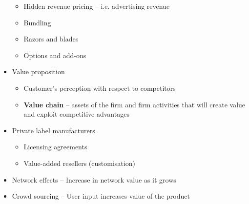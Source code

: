 \documentclass[../notes_compiled.tex]{subfiles}
\begin{document}
\begin{multicols}{2}
\begin{itemize}
\begin{itemize}
\item Hidden revenue pricing -- i.e. advertising revenue
\item Bundling
\item Razors and blades
\item Options and add-ons
\end{itemize}
\item Value proposition
\begin{itemize}
\item Customer's perception with respect to competitors
\item \textbf{Value chain} -- assets of the firm and firm activities that will create value and exploit competitive advantages
\end{itemize}
\item Private label manufacturers
\begin{itemize}
\item Licensing agreements
\item Value-added resellers (customisation)
\end{itemize}
\item Network effects -- Increase in network value as it grows
\item Crowd sourcing -- User input increases value of the product
\end{itemize}
\end{multicols}
\end{document}
